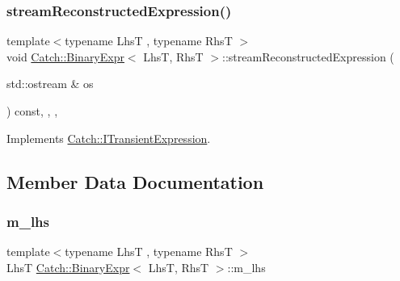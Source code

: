 \subsubsection{\texorpdfstring{streamReconstructedExpression()}{streamReconstructedExpression()}}
{\footnotesize\ttfamily template$<$typename LhsT , typename RhsT $>$ \\
void \mbox{\hyperlink{class_catch_1_1_binary_expr}{Catch\+::\+Binary\+Expr}}$<$ LhsT, RhsT $>$\+::stream\+Reconstructed\+Expression (\begin{DoxyParamCaption}\item[{std\+::ostream \&}]{os }\end{DoxyParamCaption}) const\hspace{0.3cm}{\ttfamily [inline]}, {\ttfamily [override]}, {\ttfamily [private]}, {\ttfamily [virtual]}}



Implements \mbox{\hyperlink{struct_catch_1_1_i_transient_expression_aabe1889df9c6e639a24afb08d8a0fe9e}{Catch\+::\+I\+Transient\+Expression}}.



\subsection{Member Data Documentation}
\mbox{\label{class_catch_1_1_binary_expr_a306b29e77b48f9c538c5031a59adc4ce}} 
\subsubsection{\texorpdfstring{m\_lhs}{m\_lhs}}
{\footnotesize\ttfamily template$<$typename LhsT , typename RhsT $>$ \\
LhsT \mbox{\hyperlink{class_catch_1_1_binary_expr}{Catch\+::\+Binary\+Expr}}$<$ LhsT, RhsT $>$\+::m\+\_\+lhs\hspace{0.3cm}{\ttfamily [private]}}

\mbox{\label{class_catch_1_1_binary_expr_ab21dea40c53fd64d4f7a073dbe93ec95}} 
